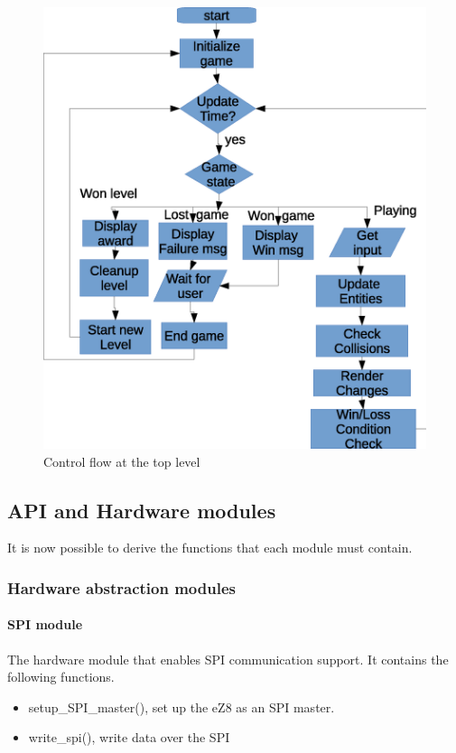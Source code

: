 \begin{figure}
	\center
	\includegraphics[scale=0.7]{pictures/top_flow.eps}
	\caption{Control flow at the top level}
	\label{top_flow}
\end{figure}

\clearpage

\subsection{API and Hardware modules}
It is now possible to derive the functions that each module must contain. 

\subsubsection{Hardware abstraction modules}
\paragraph{SPI module}
The hardware module that enables SPI communication support. It contains the following functions.
\begin{itemize}
	\item setup\_SPI\_master(), set up the eZ8 as an SPI master.
	\item write\_spi(), write data over the SPI
\end{itemize}

